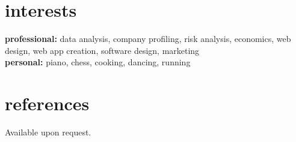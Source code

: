 \documentclass[hidelinks]{kkurucz-cv}
\begin{document}

\section{interests}
\textbf{professional:} data analysis, company profiling, risk analysis, economics, web design, web app creation, software design, marketing
\\
\textbf{personal:} piano, chess, cooking, dancing, running
\\
\section{references}
{Available upon request.}
\end{document}
